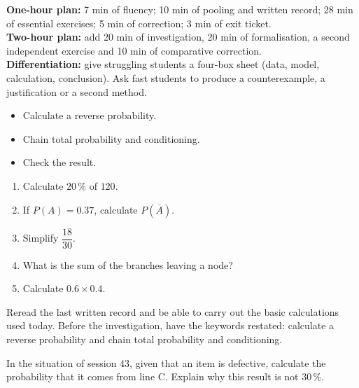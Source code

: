 \ifprof
\begin{methode}
\textbf{One-hour plan:} 7 min of fluency; 10 min of pooling and written record; 28 min of essential exercises; 5 min of correction; 3 min of exit ticket.\\
\textbf{Two-hour plan:} add 20 min of investigation, 20 min of formalisation, a second independent exercise and 10 min of comparative correction.\\
\textbf{Differentiation:} give struggling students a four-box sheet (data, model, calculation, conclusion). Ask fast students to produce a counterexample, a justification or a second method.
\end{methode}
\fi
{}
    \begin{objectifs}\begin{itemize}\item Calculate a reverse probability.\item Chain total probability and conditioning.\item Check the result.\end{itemize}\end{objectifs}
    \begin{automatismes}\begin{enumerate}\item Calculate $20\,\%$ of $120$. \item If $P(A)=0.37$, calculate $P(\overline A)$. \item Simplify $\dfrac{18}{30}$. \item What is the sum of the branches leaving a node? \item Calculate $0.6\times0.4$. \end{enumerate}\end{automatismes}
    \begin{prerequis}Reread the last written record and be able to carry out the basic calculations used today. Before the investigation, have the keywords restated: calculate a reverse probability and chain total probability and conditioning.\end{prerequis}

    \begin{activite}
    In the situation of session 43, given that an item is defective, calculate the probability that it comes from line C. Explain why this result is not $30\,\%$.
    \begin{center}\end{center}
    \end{activite}

